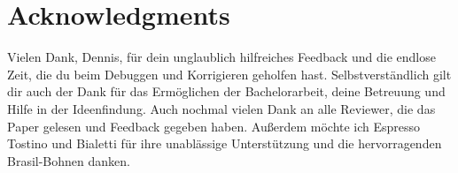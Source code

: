 \section*{Acknowledgments}\label{cha:acknowledgments}
Vielen Dank, Dennis, für dein unglaublich hilfreiches Feedback und die endlose Zeit, die du beim Debuggen und Korrigieren geholfen hast.
Selbstverständlich gilt dir auch der Dank für das Ermöglichen der Bachelorarbeit, deine Betreuung und Hilfe in der Ideenfindung.
Auch nochmal vielen Dank an alle Reviewer, die das Paper gelesen und Feedback gegeben haben.
Außerdem möchte ich Espresso Tostino und Bialetti für ihre unablässige Unterstützung und die hervorragenden Brasil-Bohnen danken.